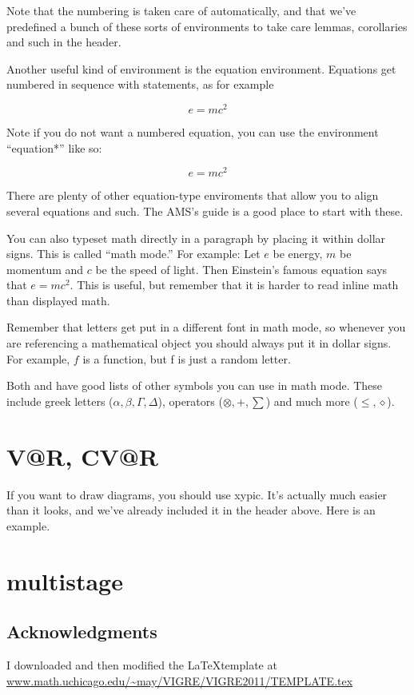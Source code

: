 \documentclass{amsart}
\theoremstyle{definition}
\theoremstyle{remark}
\begin{document}
Note that the numbering is taken care of automatically, and that we've predefined a bunch of these sorts of environments to take care lemmas, corollaries and such in the header. 

Another useful kind of environment is the equation environment.  Equations
get numbered in sequence with statements, as for example

\begin{equation}  e = mc^2
\end{equation}

Note if you do not want a numbered equation, you can use the
environment ``equation*''
 like so:

\begin{equation*}
e=mc^2
\end{equation*}

There are plenty of other equation-type enviroments that allow you to
align several equations and such. The AMS's guide is a
good place to start with these.

You can also typeset math directly in a paragraph by placing it within
dollar signs.  This is called ``math mode.''  For example: Let $e$
be energy, $m$ be momentum and $c$ be the speed of light.  Then
Einstein's famous equation says that $e=mc^2$.  This is useful, but
remember that it is harder to read inline math than displayed math. 

Remember that letters get put in a different font in math mode, so
whenever you are referencing a mathematical object you should always
put it in dollar signs.  For example, $f$ is a function, but f is just
a random letter.

Both and  have good lists of other symbols you can use in math mode.
These include greek letters ($\alpha, \beta, \Gamma, \Delta$),
operators ($\otimes, +, \sum$) and much more ($\leq, \diamond$).


\section{V@R, CV@R}

If you want to draw diagrams, you should use xypic.  It's actually
much easier than it looks, and we've already included it in the header
above.  Here is an example. 

\section{multistage}

\subsection*{Acknowledgments}  I downloaded and then modified the \LaTeX template at \url{www.math.uchicago.edu/~may/VIGRE/VIGRE2011/TEMPLATE.tex}



\end{document}
